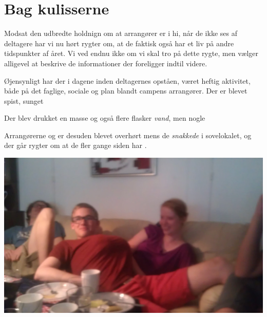 \begin{minipage}[t]{130mm}
\vspace{3mm}
\section*{Bag kulisserne}

Modsat den udbredte holdnign om at arrangører er i hi, når de ikke ses af deltagere har vi nu hørt rygter om, at de faktisk også har et liv på andre tidspunkter af året. Vi ved endnu ikke om vi skal tro på dette rygte, men vælger alligevel at beskrive de informationer der foreligger indtil videre.

Øjensynligt har der i dagene inden deltagernes opståen, været heftig aktivitet, både på det faglige, sociale og  plan blandt campens arrangører. Der er blevet spist, sunget

Der blev drukket en masse  og også flere flasker \emph{vand}, men nogle 

Arrangørerne  og  er desuden blevet overhørt mens de \emph{snakkede} i sovelokalet, og der går rygter om at de fler gange siden har       . 



\includegraphics[width=\linewidth]{Mads.jpg}

\end{minipage}

